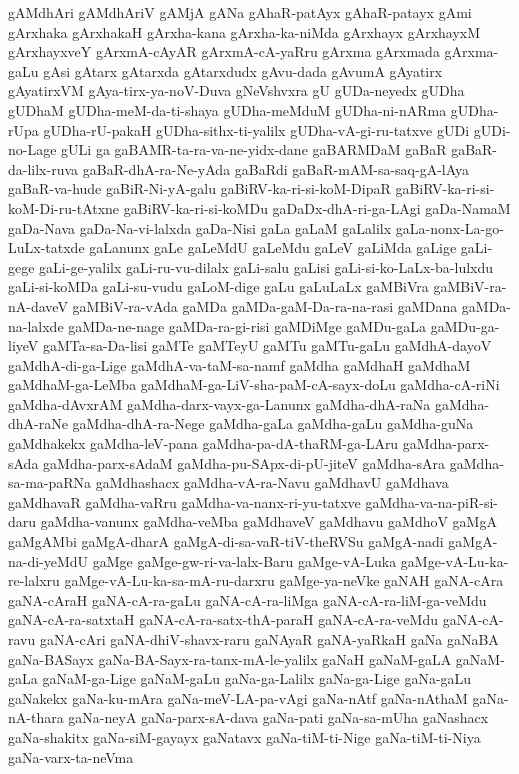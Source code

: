 {gAMdhAri
gAMdhAriV
gAMjA
gANa
gAhaR-patAyx
gAhaR-patayx
gAmi
gArxhaka
gArxhakaH
gArxha-kana
gArxha-ka-niMda
gArxhayx
gArxhayxM
gArxhayxveY
gArxmA-cAyAR
gArxmA-cA-yaRru
gArxma
gArxmada
gArxma-gaLu
gAsi
gAtarx
gAtarxda
gAtarxdudx
gAvu-dada
gAvumA
gAyatirx
gAyatirxVM
gAya-tirx-ya-noV-Duva
gNeVshvxra
gU
gUDa-neyedx
gUDha
gUDhaM
gUDha-meM-da-ti-shaya
gUDha-meMduM
gUDha-ni-nARma
gUDha-rUpa
gUDha-rU-pakaH
gUDha-sithx-ti-yalilx
gUDha-vA-gi-ru-tatxve
gUDi
gUDi-no-Lage
gULi
ga
gaBAMR-ta-ra-va-ne-yidx-dane
gaBARMDaM
gaBaR
gaBaR-da-lilx-ruva
gaBaR-dhA-ra-Ne-yAda
gaBaRdi
gaBaR-mAM-sa-saq-gA-lAya
gaBaR-va-hude
gaBiR-Ni-yA-galu
gaBiRV-ka-ri-si-koM-DipaR
gaBiRV-ka-ri-si-koM-Di-ru-tAtxne
gaBiRV-ka-ri-si-koMDu
gaDaDx-dhA-ri-ga-LAgi
gaDa-NamaM
gaDa-Nava
gaDa-Na-vi-lalxda
gaDa-Nisi
gaLa
gaLaM
gaLalilx
gaLa-nonx-La-go-LuLx-tatxde
gaLanunx
gaLe
gaLeMdU
gaLeMdu
gaLeV
gaLiMda
gaLige
gaLi-gege
gaLi-ge-yalilx
gaLi-ru-vu-dilalx
gaLi-salu
gaLisi
gaLi-si-ko-LaLx-ba-lulxdu
gaLi-si-koMDa
gaLi-su-vudu
gaLoM-dige
gaLu
gaLuLaLx
gaMBiVra
gaMBiV-ra-nA-daveV
gaMBiV-ra-vAda
gaMDa
gaMDa-gaM-Da-ra-na-rasi
gaMDana
gaMDa-na-lalxde
gaMDa-ne-nage
gaMDa-ra-gi-risi
gaMDiMge
gaMDu-gaLa
gaMDu-ga-liyeV
gaMTa-sa-Da-lisi
gaMTe
gaMTeyU
gaMTu
gaMTu-gaLu
gaMdhA-dayoV
gaMdhA-di-ga-Lige
gaMdhA-va-taM-sa-namf
gaMdha
gaMdhaH
gaMdhaM
gaMdhaM-ga-LeMba
gaMdhaM-ga-LiV-sha-paM-cA-sayx-doLu
gaMdha-cA-riNi
gaMdha-dAvxrAM
gaMdha-darx-vayx-ga-Lanunx
gaMdha-dhA-raNa
gaMdha-dhA-raNe
gaMdha-dhA-ra-Nege
gaMdha-gaLa
gaMdha-gaLu
gaMdha-guNa
gaMdhakekx
gaMdha-leV-pana
gaMdha-pa-dA-thaRM-ga-LAru
gaMdha-parx-sAda
gaMdha-parx-sAdaM
gaMdha-pu-SApx-di-pU-jiteV
gaMdha-sAra
gaMdha-sa-ma-paRNa
gaMdhashacx
gaMdha-vA-ra-Navu
gaMdhavU
gaMdhava
gaMdhavaR
gaMdha-vaRru
gaMdha-va-nanx-ri-yu-tatxve
gaMdha-va-na-piR-si-daru
gaMdha-vanunx
gaMdha-veMba
gaMdhaveV
gaMdhavu
gaMdhoV
gaMgA
gaMgAMbi
gaMgA-dharA
gaMgA-di-sa-vaR-tiV-theRVSu
gaMgA-nadi
gaMgA-na-di-yeMdU
gaMge
gaMge-gw-ri-va-lalx-Baru
gaMge-vA-Luka
gaMge-vA-Lu-ka-re-lalxru
gaMge-vA-Lu-ka-sa-mA-ru-darxru
gaMge-ya-neVke
gaNAH
gaNA-cAra
gaNA-cAraH
gaNA-cA-ra-gaLu
gaNA-cA-ra-liMga
gaNA-cA-ra-liM-ga-veMdu
gaNA-cA-ra-satxtaH
gaNA-cA-ra-satx-thA-paraH
gaNA-cA-ra-veMdu
gaNA-cA-ravu
gaNA-cAri
gaNA-dhiV-shavx-raru
gaNAyaR
gaNA-yaRkaH
gaNa
gaNaBA
gaNa-BASayx
gaNa-BA-Sayx-ra-tanx-mA-le-yalilx
gaNaH
gaNaM-gaLA
gaNaM-gaLa
gaNaM-ga-Lige
gaNaM-gaLu
gaNa-ga-Lalilx
gaNa-ga-Lige
gaNa-gaLu
gaNakekx
gaNa-ku-mAra
gaNa-meV-LA-pa-vAgi
gaNa-nAtf
gaNa-nAthaM
gaNa-nA-thara
gaNa-neyA
gaNa-parx-sA-dava
gaNa-pati
gaNa-sa-mUha
gaNashacx
gaNa-shakitx
gaNa-siM-gayayx
gaNatavx
gaNa-tiM-ti-Nige
gaNa-tiM-ti-Niya
gaNa-varx-ta-neVma
}
